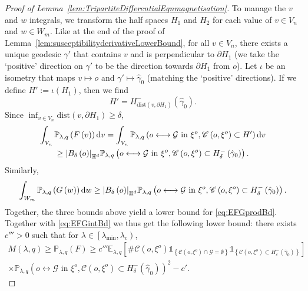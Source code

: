 \documentclass[10pt,a4paper,dvipsnames]{article}
\theoremstyle{definition}
\theoremstyle{remark}
\newcommand{\plaq}{\mathbb{P}_{\lambda,q}}
\newcommand{\elaq}{\mathbb E_{\lambda,q}}
\newcommand{\HypDim}{{\mathbb{H}^d}}
\newcommand{\dd}{\mathrm{d}} %
\newcommand{\C}{\mathscr {C}}
\newcommand{\Gcal}{\mathcal{G}}
\newcommand{\conn}[3]{#1 \longleftrightarrow #2\textrm { in } #3}
\newcommand{\Id}{\mathds 1}
\DeclarePairedDelimiter\abs{\lvert}{\rvert}
\newcommand{\habsd}[1]{\abs*{#1}_\HypDim}
\newcommand{\dist}[1]{\mathrm{dist}\left(#1\right)}
\newcommand{\orig}{o}
\numberwithin{equation}{section}
\begin{document}
\begin{proof}[Proof of Lemma~\ref{lem:TripartiteDifferentialEqnmagnetisation}]
    To manage the $v$ and $w$ integrals, we transform the half spaces $H_1$ and $H_2$ for each value of $v\in V_n$ and $w\in W_m$. Like at the end of the proof of Lemma~\ref{lem:susceptibilityderivativeLowerBound}, for all $v\in V_n$, there exists a unique geodesic $\gamma'$ that contains $v$ and is perpendicular to $\partial H_1$ (we take the `positive' direction on $\gamma'$ to be the direction towards $\partial H_1$ from $\orig$). Let $\iota$ be an isometry that maps $v\mapsto\orig$ and $\gamma'\mapsto\hat{\gamma}_0$ (matching the `positive' directions). If we define $H':=\iota\left(H_1\right)$, then we find
    \begin{equation}
        H' = H^-_{\dist{v,\partial H_1}}\left(\hat\gamma_0\right).
    \end{equation}
    Since $\inf_{v\in V_n}\dist{v,\partial H_1}\geq \delta$,
    \begin{multline}
        \int_{V_n}\plaq\left(F\left(v\right)\right) \dd v = \int_{V_n}\plaq\left(\conn{\orig}{\Gcal}{\xi^\orig},\C\left(\orig,\xi^\orig\right)\subset H'\right)\dd v \\\geq \habsd{B_\delta\left(\orig\right)}\plaq\left(\conn{\orig}{\Gcal}{\xi^\orig},\C\left(\orig,\xi^\orig\right)\subset H^-_{\delta}\left(\hat\gamma_0\right)\right).
    \end{multline}
    Similarly, 
    \begin{equation}
        \int_{W_m}\plaq\left(G\left(w\right)\right) \dd w \geq \habsd{B_\delta\left(\orig\right)}\plaq\left(\conn{\orig}{\Gcal}{\xi^\orig},\C\left(\orig,\xi^\orig\right)\subset H^-_\delta\left(\hat\gamma_0\right)\right).
    \end{equation}
    Together, the three bounds above yield a lower bound for \eqref{eq:EFGprodBd}. Together with \eqref{eq:EFGintBd} we thus get the following lower bound:
    there exists $c'''>0$ such that for $\lambda\in\left[\lambda_{\min},\lambda_{\mathrm{c}}\right)$, 
    \begin{multline}
        M\left(\lambda,q\right) \geq \plaq\left(F\right) \geq c''' \elaq\left[\#\C\left(\orig,\xi^{\orig}\right)\Id_{\left\{\C\left(\orig,\xi^{\orig}\right)\cap \Gcal = \emptyset\right\}} \Id_{\left\{\C\left(\orig,\xi^{\orig}\right)\subset H^-_\varepsilon\left(\hat\gamma_0\right)\right\}}\right] \\\times\plaq\left(\conn{\orig}{\Gcal}{\xi^\orig},\C\left(\orig,\xi^\orig\right)\subset H^-_\delta\left(\hat\gamma_0\right)\right)^2 - c'.
    \end{multline}
    

\end{proof}
\end{document}
